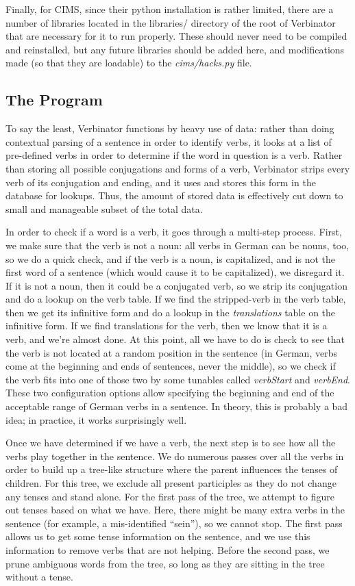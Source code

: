 \documentclass[12pt]{article}
\begin{document}
Finally, for CIMS, since their python installation is rather limited, there are a number of libraries
located in the libraries/ directory of the root of Verbinator that are necessary for it to run
properly.  These should never need to be compiled and reinstalled, but any future libraries should
be added here, and modifications made (so that they are loadable) to the \emph{cims/hacks.py} file.


\subsection{The Program}

To say the least, Verbinator functions by heavy use of data: rather than doing contextual parsing of
a sentence in order to identify verbs, it looks at a list of pre-defined verbs in order to determine
if the word in question is a verb.  Rather than storing all possible conjugations and forms of a verb,
Verbinator strips every verb of its conjugation and ending, and it uses and stores this form in the
database for lookups.  Thus, the amount of stored data is effectively cut down to small and manageable
subset of the total data.

In order to check if a word is a verb, it goes through a multi-step process.  First, we make sure that
the verb is not a noun: all verbs in German can be nouns, too, so we do a quick check, and if the verb
is a noun, is capitalized, and is not the first word of a sentence (which would cause it to be capitalized),
we disregard it.  If it is not a noun, then it could be a conjugated verb, so we strip its conjugation
and do a lookup on the verb table.  If we find the stripped-verb in the verb table, then we get
its infinitive form and do a lookup in the \emph{translations} table on the infinitive form.  If we find
translations for the verb, then we know that it is a verb, and we're almost done.  At this point,
all we have to do is check to see that the verb is not located at a random position in the sentence
(in German, verbs come at the beginning and ends of sentences, never the middle), so we check if the
verb fits into one of those two by some tunables called \emph{verbStart} and \emph{verbEnd}.  These
two configuration options allow specifying the beginning and end of the acceptable range of German
verbs in a sentence.  In theory, this is probably a bad idea; in practice, it works surprisingly well.

Once we have determined if we have a verb, the next step is to see how all the verbs play together
in the sentence.  We do numerous passes over all the verbs in order to build up a tree-like structure
where the parent influences the tenses of children.  For this tree, we exclude all present participles
as they do not change any tenses and stand alone.  For the first pass of the tree, we attempt to figure
out tenses based on what we have.  Here, there might be many extra verbs in the sentence (for example,
a mis-identified ``sein''), so we cannot stop.  The first pass allows us to get some tense information
on the sentence, and we use this information to remove verbs that are not helping.  Before the second
pass, we prune ambiguous words from the tree, so long as they are sitting in the tree without a tense.
\end{document}
